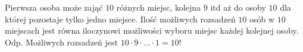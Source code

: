\medskip
{} 
\medskip

Pierwsza osoba może zająć $10$ różnych miejsc, kolejna $9$ itd aż do osoby $10$ dla której pozostaje tylko jedno miejsce. Ilość możliwych rozsadzeń $10$ osób w $10$ miejscach jest równa iloczynowi możliwości wyboru miejsc każdej kolejnej osoby.
\\
Odp. Możliwych rozsadzeń jest $10 \cdot 9 \cdot . . . \cdot 1 = 10!$
